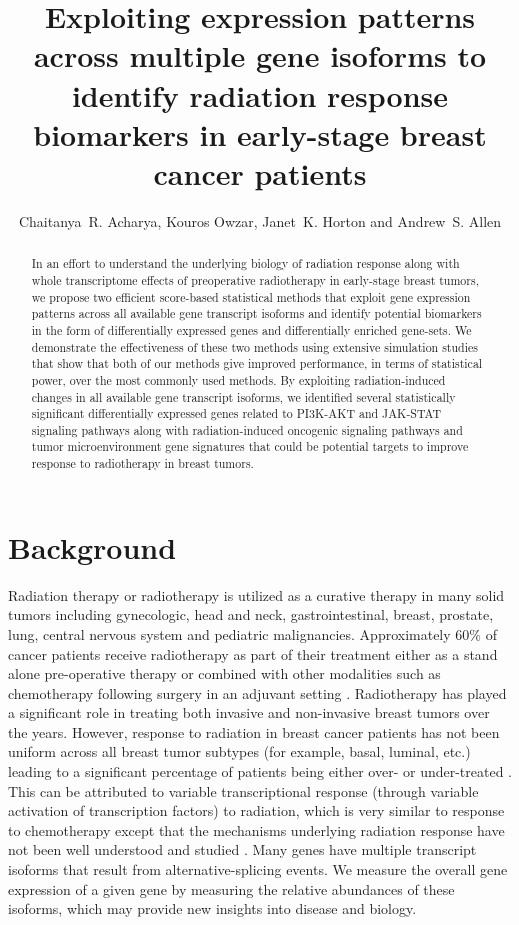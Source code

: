 \documentclass[hidelinks,11pt]{article}
\title{Exploiting expression patterns across multiple gene isoforms to identify radiation response biomarkers in early-stage breast cancer patients}
\author{Chaitanya~R. Acharya, Kouros Owzar, Janet~K. Horton and Andrew~S. Allen}
\date{}
\begin{document}
\maketitle



\begin{abstract}
In an effort to understand the underlying biology of radiation response along with whole transcriptome effects of preoperative radiotherapy in early-stage breast tumors, we propose two efficient score-based statistical methods that exploit gene expression patterns across all available gene transcript isoforms and identify potential biomarkers in the form of differentially expressed genes and differentially enriched gene-sets. We demonstrate the effectiveness of these two methods using extensive simulation studies that show that both of our methods give improved performance, in terms of statistical power, over the most commonly used methods. By exploiting radiation-induced changes in all available gene transcript isoforms, we identified several statistically significant differentially expressed genes related to PI3K-AKT and JAK-STAT signaling pathways along with radiation-induced oncogenic signaling pathways and tumor microenvironment gene signatures that could be potential targets to improve response to radiotherapy in breast tumors.
\end{abstract}

\section*{Background}

Radiation therapy or radiotherapy is utilized as a curative therapy in many solid tumors including gynecologic, head and neck, gastrointestinal, breast, prostate, lung, central nervous system and pediatric malignancies. Approximately 60\% of cancer patients receive radiotherapy as part of their treatment either as a stand alone pre-operative therapy or combined with other modalities such as chemotherapy following surgery in an adjuvant setting \cite{radonc_book}. Radiotherapy has played a significant role in treating both invasive and non-invasive breast tumors over the years. However, response to radiation in breast cancer patients has not been uniform across all breast tumor subtypes (for example, basal, luminal, etc.) leading to a significant percentage of patients being either over- or under-treated \cite{fas,subtypes_rad}. This can be attributed to variable transcriptional response (through variable activation of transcription factors) to radiation, which is very similar to response to chemotherapy except that the mechanisms underlying radiation response have not been well understood and studied \cite{Macaeva,Wushou2015}. Many genes have multiple transcript isoforms that result from alternative-splicing events. We measure the overall gene expression of a given gene by measuring the relative abundances of these isoforms, which may provide new insights into disease and biology. 
\end{document}

